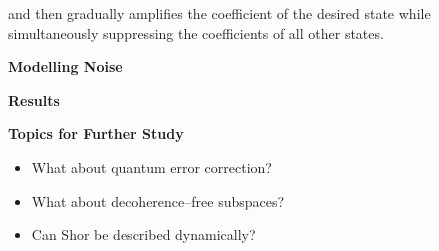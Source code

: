 \documentclass{slides}
\begin{document}
and then gradually amplifies the coefficient of the desired state
while simultaneously suppressing the coefficients of all other
states.






\pagebreak


\begin{center}
\textbf{Modelling Noise}
\end{center}

\pagebreak


\begin{center}
\textbf{Results}
\end{center}

\begin{center}
\end{center}

\begin{center}
\end{center}


\pagebreak


\begin{center}
\textbf{Topics for Further Study}
\end{center}

\begin{itemize}
\item What about quantum error correction?
\item What about decoherence--free subspaces?
\item Can Shor be described dynamically?
\end{itemize}

\pagebreak


\end{document}
